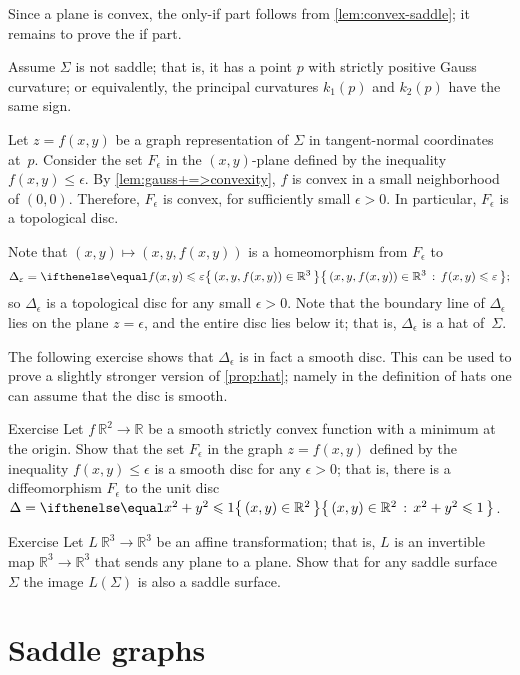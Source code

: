 Since a plane is convex, the only-if part follows from \ref{lem:convex-saddle};
it remains to prove the if part.

Assume $\Sigma$ is not saddle; that is, it has a point $p$ with strictly positive Gauss curvature;
or equivalently, the principal curvatures $k_1(p)$ and $k_2(p)$ have the same sign.


Let $z=f(x,y)$ be a graph representation of $\Sigma$ in tangent-normal coordinates at~$p$.
Consider the set $F_\epsilon$ in the $(x,y)$-plane defined by the inequality $f(x,y)\le \epsilon$.
By \ref{lem:gauss+=>convexity}, $f$ is convex in a small neighborhood of $(0,0)$.
Therefore, $F_\epsilon$ is convex, for sufficiently small $\epsilon>0$.
In particular, $F_\epsilon$ is a topological disc.

Note that $(x,y)\mapsto (x,y,f(x,y))$ is a homeomorphism from $F_\epsilon$
to
\[\Delta_\epsilon=\set{(x,y,f(x,y))\in \mathbb{R}^3}{f(x,y)\le \epsilon};\]
so $\Delta_\epsilon$ is a topological disc for any small $\epsilon>0$.
Note that the boundary line of $\Delta_\epsilon$ lies on the plane $z=\epsilon$, and the entire disc lies below it;
that is, $\Delta_\epsilon$ is a hat of~$\Sigma$.
\qeds

The following exercise shows that $\Delta_\epsilon$ is in fact a smooth disc.
This can be used to prove a slightly stronger version of \ref{prop:hat};
namely in the definition of hats one can assume that the disc is smooth.

\begin{thm}{Exercise}\label{ex:disc-hat}
Let $f\:\mathbb{R}^2\to\mathbb{R}$ be a smooth strictly convex function with a minimum at the origin.
Show that the set $F_\epsilon$ in the graph $z=f(x,y)$ defined by the inequality $f(x,y)\le \epsilon$ is a smooth disc for any $\epsilon>0$;
that is, there is a diffeomorphism 
$F_\epsilon$ to the unit disc $\Delta\z=\set{(x,y)\in\mathbb{R}^2}{x^2+y^2\le 1}$.
\end{thm}

\begin{thm}{Exercise}\label{ex:saddle-linear}
Let $L\:\mathbb{R}^3\to\mathbb{R}^3$ be an affine transformation; that is, $L$ is an invertible map $\mathbb{R}^3\to\mathbb{R}^3$ that sends any plane to a plane. 
Show that for any saddle surface $\Sigma$ the image $L(\Sigma)$ is also a saddle surface.
\end{thm}


\section{Saddle graphs}

